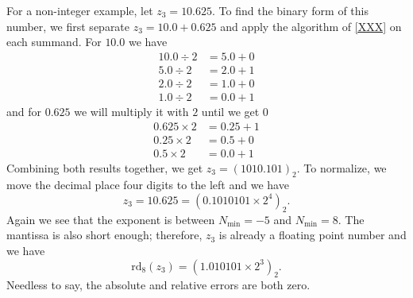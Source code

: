 \begin{exmp}
    For a non-integer example, let \(z_3 = 10.625\). To find the binary form of this number, we first separate \(z_3 = 10.0 + 0.625\) and apply the algorithm of \ref{XXX} on each summand. For \(10.0\) we have
    \begin{align*}
        10.0 \div 2 &= 5.0 + 0 \\
        5.0 \div 2 &= 2.0 + 1 \\
        2.0 \div 2 &= 1.0 + 0 \\
        1.0 \div 2 &= 0.0 + 1
    \end{align*}
    and for \(0.625\) we will multiply it with \(2\) until we get \(0\)
    \begin{align*}
        0.625 \times 2 &= 0.25 + 1 \\
        0.25 \times 2 &= 0.5 + 0 \\
        0.5 \times 2 &= 0.0 + 1
    \end{align*}
    Combining both results together, we get \(z_3 = (1010.101)_2\). To normalize, we move the decimal place four digits to the left and we have
    \begin{equation*}
        z_3 = 10.625 = (0.1010101 \times 2^4)_2 \text{.}
    \end{equation*}
    Again we see that the exponent is between \(N_{\text{min}} = -5\) and \(N_{\text{min}} = 8\). The mantissa is also short enough; therefore, \(z_3\) is already a floating point number and we have
    \begin{equation*}
        \text{rd}_8(z_3) = (1.010101 \times 2^3)_2 \text{.}
    \end{equation*}
    Needless to say, the absolute and relative errors are both zero.
\end{exmp}
%
%
